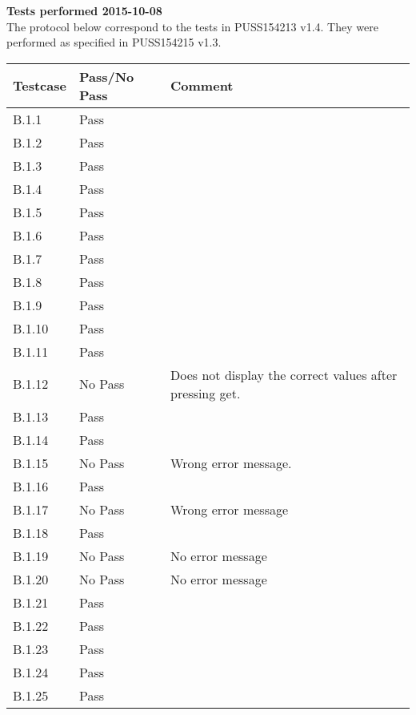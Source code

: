 \renewcommand{\testdate}{2015-10-08}
\textbf{ Tests performed \testdate} \\
The protocol below correspond to the tests in PUSS154213 v1.4. They were performed as specified in PUSS154215 v1.3.
\begin{center}
  		\begin{tabular}{| p{3cm} | p{5cm} | p{5cm} |}
    		\hline
	    	\textbf{Testcase}			& \textbf{Pass/No Pass} 	& \textbf{Comment} \\ \hline
    		B.1.1		 						& Pass 										&  				\\ \hline
    		B.1.2		 						& Pass 										& 				 \\	\hline
    		B.1.3		 						& Pass 										& 				 \\	\hline
    		B.1.4		 						& Pass 										& 				 \\	\hline
    		B.1.5		 						& Pass 										& 				 \\	\hline
    		B.1.6		 						& Pass 										& 				 \\	\hline
    		B.1.7		 						& Pass 										& 				 \\	\hline
    		B.1.8		 						& Pass 										& 				 \\	\hline
    		B.1.9		 						& Pass 										& 				 \\	\hline
    		B.1.10	 							& Pass 										& 				 \\	\hline
    		B.1.11	 							& Pass 										& 				 \\	\hline
    		B.1.12	 							& No Pass 										& Does not display the correct values after pressing get.				 \\	\hline
    		B.1.13	 							& Pass 										& 				 \\	\hline
    		B.1.14	 							& Pass 										& 				 \\	\hline
    		B.1.15	 							& No Pass 										& Wrong error message.				 \\	\hline
    		B.1.16	 							& Pass 										& 				 \\	\hline
    		B.1.17	 							& No Pass								& Wrong error message				 \\	\hline
    		B.1.18	 							& Pass 										& 				 \\	\hline
    		B.1.19	 							& No Pass 										& No error message				 \\	\hline
    		B.1.20	 							& No Pass 										& No error message \\ \hline
    		B.1.21	 							& Pass 										& \\ \hline
    		B.1.22	 							& Pass										&  \\ \hline
    		B.1.23	 							& Pass											&  \\ \hline
    		B.1.24	 							& Pass											&  \\ \hline
    		B.1.25	 							& Pass											&  \\ \hline
 		 \end{tabular}
	\end{center}